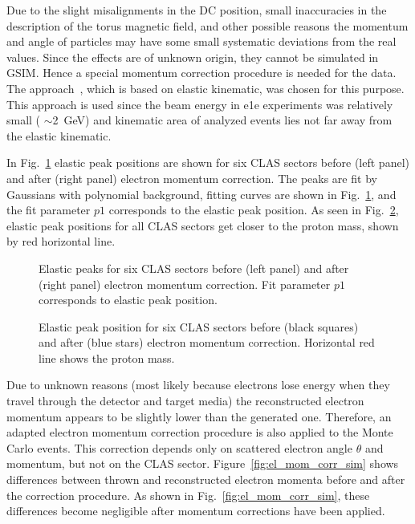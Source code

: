 Due to the slight misalignments in the DC position,  small inaccuracies in
the description of the torus magnetic field, and other possible reasons the momentum and angle of
particles may have some small systematic deviations from the real values. 
Since the effects are of unknown origin, they cannot be simulated in GSIM. 
Hence a special momentum correction procedure is needed for the data. The approach~\cite{KPark:momcorr}, which is based on elastic kinematic, was chosen for this purpose. This approach is used since the beam energy in e1e experiments was relatively small ( $\sim$2~GeV) and kinematic area of analyzed events lies not far away from the elastic kinematic. 

In Fig.~\ref{fig:el_mom_corr_elast} elastic peak positions are shown for six CLAS sectors before (left panel) and after (right panel) electron momentum correction. The peaks are fit by Gaussians with polynomial background, fitting curves are shown in Fig.~\ref{fig:el_mom_corr_elast}, and the fit parameter $p1$ corresponds to the elastic peak position.  As seen in Fig.~\ref{fig:el_mom_corr_peak_position}, elastic peak positions for all CLAS sectors get closer to the proton mass, shown by red horizontal line.
\begin{figure}[htp]
\begin{center}
\caption{\small Elastic peaks for six CLAS sectors before (left panel) and after (right panel) electron momentum correction. Fit parameter $p1$ corresponds to elastic peak position. \label{fig:el_mom_corr_elast}} 
\end{center}
\end{figure}

\begin{figure}[htp]
\begin{center}
\caption{\small Elastic peak position for six CLAS sectors before (black squares) and after (blue stars) electron momentum correction. Horizontal red line shows the proton mass. \label{fig:el_mom_corr_peak_position}} 
\end{center}
\end{figure}

Due to unknown reasons (most likely because electrons lose energy when they travel through the detector and target media) the reconstructed electron momentum appears to be slightly lower than the generated one. Therefore, an adapted electron momentum correction procedure is also applied to the Monte Carlo events. This correction depends only on scattered electron angle $\theta$ and momentum, but not on the CLAS sector.   
Figure~\ref{fig:el_mom_corr_sim} shows differences between thrown and reconstructed electron momenta before and after the correction procedure. As shown in Fig.~\ref{fig:el_mom_corr_sim}, these differences become negligible after momentum corrections have been applied.


